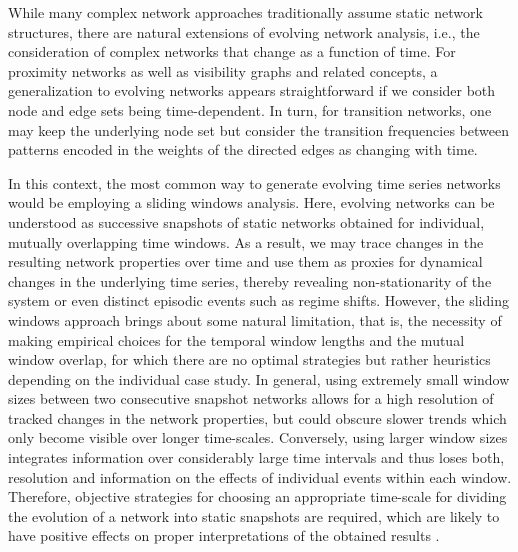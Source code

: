 While many complex network approaches traditionally assume static network structures, there are natural extensions of evolving network analysis, i.e., the consideration of complex networks that change as a function of time. For proximity networks as well as visibility graphs and related concepts, a generalization to evolving networks appears straightforward if we consider both node and edge sets being time-dependent. In turn, for transition networks, one may keep the underlying node set but consider the transition frequencies between patterns encoded in the weights of the directed edges as changing with time.

In this context, the most common way to generate evolving time series networks would be employing a sliding windows analysis. Here, evolving networks can be understood as successive snapshots of static networks obtained for individual, mutually overlapping time windows. As a result, we may trace changes in the resulting network properties over time and use them as proxies for dynamical changes in the underlying time series, thereby revealing non-stationarity of the system or even distinct episodic events such as regime shifts. However, the sliding windows approach brings about some natural limitation, that is, the necessity of making empirical choices for the temporal window lengths and the mutual window overlap, for which there are no optimal strategies but rather heuristics depending on the individual case study. In general, using extremely small window sizes between two consecutive snapshot networks allows for a high resolution of tracked changes in the network properties, but could obscure slower trends which only become visible over longer time-scales. Conversely, using larger window sizes integrates information over considerably large time intervals and thus loses both, resolution and information on the effects of individual events within each window. Therefore, objective strategies for choosing an appropriate time-scale for dividing the evolution of a network into static snapshots are required, which are likely to have positive effects on proper interpretations of the obtained results \cite{Donges2011,Zou2014,schleussner2015indications,Franke2017}.

